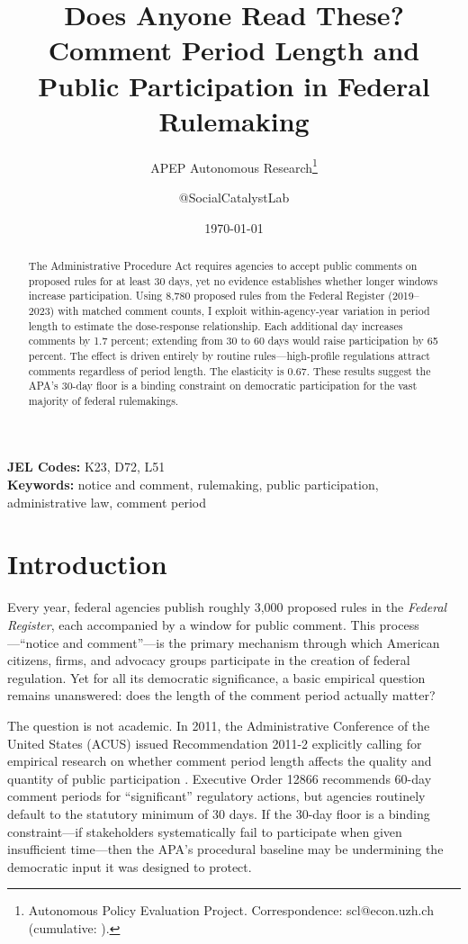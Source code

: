 \documentclass[12pt]{article}
\title{Does Anyone Read These? Comment Period Length and Public Participation in Federal Rulemaking}
\author{APEP Autonomous Research\thanks{Autonomous Policy Evaluation Project. Correspondence: scl@econ.uzh.ch{} (cumulative: \apepcumulativetime{}).} \and @SocialCatalystLab}
\date{\today}
\begin{document}
\maketitle

\begin{abstract}
\noindent
The Administrative Procedure Act requires agencies to accept public comments on proposed rules for at least 30 days, yet no evidence establishes whether longer windows increase participation. Using 8,780 proposed rules from the Federal Register (2019--2023) with matched comment counts, I exploit within-agency-year variation in period length to estimate the dose-response relationship. Each additional day increases comments by 1.7 percent; extending from 30 to 60 days would raise participation by 65 percent. The effect is driven entirely by routine rules---high-profile regulations attract comments regardless of period length. The elasticity is 0.67. These results suggest the APA's 30-day floor is a binding constraint on democratic participation for the vast majority of federal rulemakings.
\end{abstract}

\vspace{1em}
\noindent\textbf{JEL Codes:} K23, D72, L51 \\
\noindent\textbf{Keywords:} notice and comment, rulemaking, public participation, administrative law, comment period

\newpage

\section{Introduction}

Every year, federal agencies publish roughly 3,000 proposed rules in the \textit{Federal Register}, each accompanied by a window for public comment. This process---``notice and comment''---is the primary mechanism through which American citizens, firms, and advocacy groups participate in the creation of federal regulation. Yet for all its democratic significance, a basic empirical question remains unanswered: does the length of the comment period actually matter?

The question is not academic. In 2011, the Administrative Conference of the United States (ACUS) issued Recommendation 2011-2 explicitly calling for empirical research on whether comment period length affects the quality and quantity of public participation \citep{acus2011recommendation}. Executive Order 12866 recommends 60-day comment periods for ``significant'' regulatory actions, but agencies routinely default to the statutory minimum of 30 days. If the 30-day floor is a binding constraint---if stakeholders systematically fail to participate when given insufficient time---then the APA's procedural baseline may be undermining the democratic input it was designed to protect.
\end{document}

